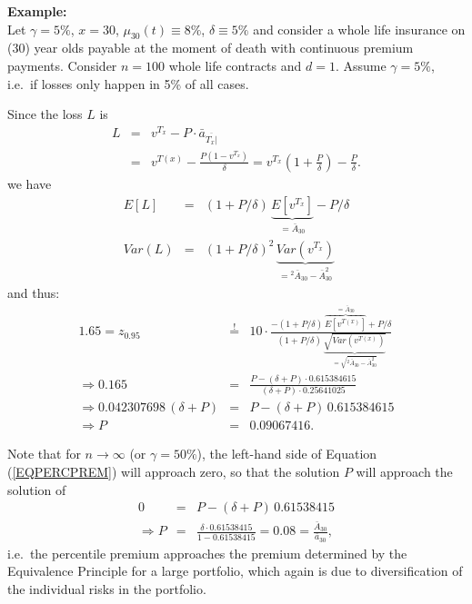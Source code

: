 \documentclass[11pt,fleqn,oneside]{book}
\begin{document}
\noindent \textbf{Example:}\\
Let $\gamma = 5\%$, $x=30$, $\mu_{30}(t) \equiv 8\%$, $\delta \equiv 5\%$ and consider a whole life insurance on (30) year olds payable at the moment of death with continuous premium payments. Consider $n = 100$ whole life contracts and $d=1$. Assume $\gamma=5\%$, i.e.\ if losses only happen in 5\% of all cases. 

Since the loss $L$ is 
\begin{eqnarray*}
L &=& v^{T_x} - P\cdot \bar{a}_{\overline{T_x|}}\\
&=& v^{T(x)} - \frac{P \left(1-v^{T_x}\right)}{\delta} = v^{T_x} \left(1 + \frac{P}{\delta}\right) - \frac{P}{\delta}.
\end{eqnarray*}
we have
\begin{eqnarray*}
E[L] &=& (1+P/\delta)\,\underbrace{E[v^{T_x}]}_{=\bar{A}_{30}} - P/\delta\\
Var(L) &=& (1 + P/\delta)^2 \, \underbrace{Var(v^{T_x})}_{={^2\bar{A}_{30}} - \bar{A}_{30}^2}
\end{eqnarray*}
and thus:
\begin{eqnarray}
1.65 = z_{0.95} &\stackrel{!}{=}& 10 \cdot \frac{-(1+P/\delta)\,\overbrace{E[v^{T(x)}]}^{=\bar{A}_{30}} + P/\delta
}{(1 + P/\delta) \, \underbrace{\sqrt{Var(v^{T(x)})}}_{=
\sqrt{{^2\bar{A}_{30}} - \bar{A}_{30}^2}}}  
\nonumber \\
\Rightarrow 0.165 &=& \frac{P - (\delta + P)\cdot 0.615384615}{(\delta + P) \cdot 0.25641025} \label{EQPERCPREM}\\
\Rightarrow 0.042307698 \, (\delta + P) &=& P - (\delta + P)\, 0.615384615 \nonumber \\
\Rightarrow P &=& 0.09067416. \nonumber
\end{eqnarray}

Note that for $n \rightarrow \infty$ (or $\gamma = 50\%$), the left-hand side of Equation (\ref{EQPERCPREM}) will approach zero, so that the solution $P$ will approach the solution of 
\begin{eqnarray*}
0 &=& P - (\delta + P)\, 0.61538415 \\
\Rightarrow P &=& \frac{\delta \cdot 0.61538415}{1 - 0.61538415} = 0.08 = \frac{\bar{A}_{30}}{\bar{a}_{30}},
\end{eqnarray*}
i.e.\ the percentile premium approaches the premium determined by the Equivalence Principle for a large portfolio, which again is due to diversification of the individual risks in the portfolio.
\end{document}

